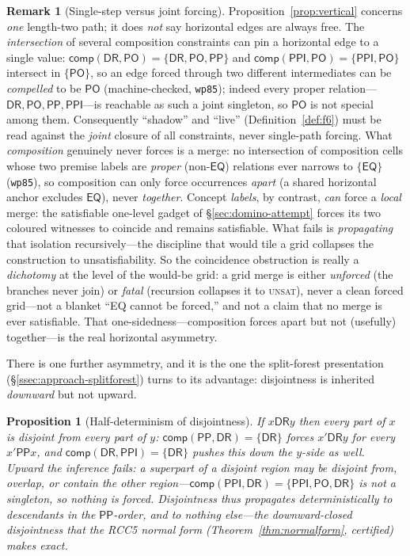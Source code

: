 \documentclass[11pt]{article}
\newcommand{\DR}{\mathsf{DR}}
\newcommand{\PO}{\mathsf{PO}}
\newcommand{\PP}{\mathsf{PP}}
\newcommand{\PPI}{\mathsf{PPI}}
\newcommand{\EQ}{\mathsf{EQ}}
\newcommand{\comp}{\ensuremath{\mathsf{comp}}}
\theoremstyle{plain}
\newtheorem{proposition}[theorem]{Proposition}
\theoremstyle{definition}
\newtheorem{remark}[theorem]{Remark}
\begin{document}
\begin{remark}[Single-step versus joint forcing]\label{rem:pojoint}
Proposition~\ref{prop:vertical} concerns \emph{one} length-two path; it does
\emph{not} say horizontal edges are always free. The \emph{intersection} of
several composition constraints can pin a horizontal edge to a single value:
$\comp(\DR,\PO)=\{\DR,\PO,\PP\}$ and $\comp(\PPI,\PO)=\{\PPI,\PO\}$ intersect
in $\{\PO\}$, so an edge forced through two different intermediates can be
\emph{compelled} to be $\PO$ (machine-checked, \texttt{wp85}); indeed every
proper relation---$\DR,\PO,\PP,\PPI$---is reachable as such a joint singleton,
so $\PO$ is not special among them. Consequently ``shadow'' and ``live''
(Definition~\ref{def:f6}) must be read against the \emph{joint} closure of all
constraints, never single-path forcing. What \emph{composition} genuinely
never forces is a merge: no intersection of composition cells whose two
premise labels are \emph{proper} (non-$\EQ$) relations ever narrows to
$\{\EQ\}$ (\texttt{wp85}), so composition can only force occurrences
\emph{apart} (a shared horizontal anchor excludes $\EQ$), never
\emph{together}. Concept \emph{labels}, by contrast, \emph{can} force a
\emph{local} merge: the satisfiable one-level gadget of
\S\ref{sec:domino-attempt} forces its two coloured witnesses to coincide
and remains satisfiable. What fails is \emph{propagating} that isolation
recursively---the discipline that would tile a grid collapses the
construction to unsatisfiability. So the coincidence obstruction is really
a \emph{dichotomy} at the level of the would-be grid: a grid merge is
either \emph{unforced} (the branches never join) or \emph{fatal}
(recursion collapses it to \textsc{unsat}), never a clean forced
grid---not a blanket ``EQ cannot be forced,'' and not a claim that no
merge is ever satisfiable. That one-sidedness---composition forces apart
but not (usefully) together---is the real horizontal asymmetry.
\end{remark}

There is one further asymmetry, and it is the one the split-forest
presentation (\S\ref{ssec:approach-splitforest}) turns to its advantage:
disjointness is inherited \emph{downward} but not upward.

\begin{proposition}[Half-determinism of disjointness]\label{prop:drdown}
If $x\mathbin{\DR}y$ then every part of $x$ is disjoint from every part of
$y$: $\comp(\PP,\DR)=\{\DR\}$ forces $x'\mathbin{\DR}y$ for every
$x'\mathbin{\PP}x$, and $\comp(\DR,\PPI)=\{\DR\}$ pushes this down the
$y$-side as well. \emph{Upward} the inference fails: a \emph{superpart} of
a disjoint region may be disjoint from, overlap, or contain the other
region---$\comp(\PPI,\DR)=\{\PPI,\PO,\DR\}$ is not a singleton, so nothing
is forced. Disjointness thus propagates deterministically to descendants
in the $\PP$-order, and to nothing else---the \emph{downward-closed
disjointness} that the RCC5 normal form (Theorem~\ref{thm:normalform},
certified) makes exact.
\end{proposition}
\end{document}
